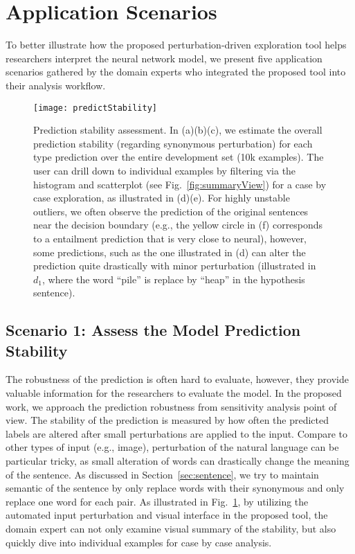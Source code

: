 \section{Application Scenarios}
\label{sec:caseStudy}
To better illustrate how the proposed perturbation-driven exploration tool helps researchers interpret the neural network model, we present five application scenarios gathered by the domain experts who integrated the proposed tool into their analysis workflow.

\begin{figure}[htbp]
\centering
 \texttt{[image: predictStability]}
 \caption{
Prediction stability assessment. In (a)(b)(c), we estimate the overall prediction stability (regarding synonymous perturbation) for each type prediction over the entire development set (10k examples). The user can drill down to individual examples by filtering via the histogram and scatterplot (see Fig.~\ref{fig:summaryView}) for a case by case exploration, as illustrated in (d)(e). For highly unstable outliers, we often observe the prediction of the original sentences near the decision boundary (e.g., the yellow circle in (f) corresponds to a entailment prediction that is very close to neural), however, some predictions, such as the one illustrated in (d) can alter the prediction quite drastically with minor perturbation (illustrated in $d_1$, where the word ``pile'' is replace by ``heap'' in the hypothesis sentence).
%
}
\label{fig:predictStability}
\end{figure}

\subsection{Scenario 1: Assess the Model Prediction Stability}
The robustness of the prediction is often hard to evaluate, however, they provide valuable information for the researchers to evaluate the model.
%
In the proposed work, we approach the prediction robustness from sensitivity analysis point of view. The stability of the prediction is measured by how often the predicted labels are altered after small perturbations are applied to the input. 
%
Compare to other types of input (e.g., image), perturbation of the natural language can be particular tricky, as small alteration of words can drastically change the meaning of the sentence. As discussed in Section~\ref{sec:sentence}, we try to maintain semantic of the sentence by only replace words with their synonymous and only replace one word for each pair.
%
As illustrated in Fig.~\ref{fig:predictStability}, by utilizing the automated input perturbation and visual interface in the proposed tool, the domain expert can not only examine visual summary of the stability, but also quickly dive into individual examples for case by case analysis.%

